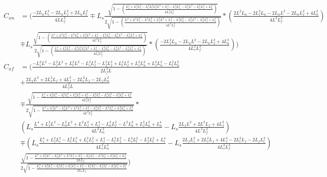 \documentclass[11pt, landscape]{article}
\begin{document}
\begin{align}
  C_{xn} &= \Bigg(\frac{-2L_nL_s^2 - 2L_nL_f^2 + 2L_nL_t^2}{4LL_f^2}
  \mp L_s\frac{\sqrt{1-\left(\frac{L_s^4 + L_s^2L_f^2 - L_s^2L_t^2 L_f^2L^2 + L_f^4 - L_f^2L_n^2 - L_n^2L^2 - L_n^2L_f^2 + L_n^4}{4L_{s}^2L_f^2}\right)}}{2\sqrt{1 - \left(\frac{L^4 + L^2L_f^2 - L^2L_n^2 + L_f^2L^2 + L_f^4 - L_f^2L_n^2 - L_n^2L^2 - L_n^2L_f^2 + L_n^4}{4L^2L_f^2}\right)}}
  *\left(\frac{2L^2L_n - 2L_f^2L_n - 2L_nL^2 - 2L_nL_f^2 + 4L_n^3}{4L^2L_f^2}\right)\\
  &\mp L_s\frac{\sqrt{1 - \left(\frac{L^4 + L^2L_f^2 - L^2L_n^2 + L_f^2L^2 + L_f^4 - L_f^2L_n^2 - L_n^2L^2 - L_n^2L_f^2 + L_n^4}{4L^2L_f^2}\right)}}{2\sqrt{1-\left(\frac{L_s^4 + L_s^2L_f^2 - L_s^2L_t^2 L_f^2L^2 + L_f^4 - L_f^2L_n^2 - L_n^2L^2 - L_n^2L_f^2 + L_n^4}{4L_{s}^2L_f^2}\right)}}
  *\left(\frac{-2L_f^2L_n - 2L_nL^2 - 2L_nL_f^2 + 4L_n^3}{4L_{s}^2L_f^2}\right)\Bigg)\\
  C_{xf} &= \Bigg(\frac{-L_s^2L^2 - L_f^2L^2 + L_t^2L^2 - L_s^2L_f^2 - L_f^2L_f^2 + L_t^2L_f^2 + L_s^2L_n^2 + L_f^2L_n^2 - L_t^2L_n^2}{{2L_f^{3}L}}\\
  &+ \frac{2L_fL^2 + 2L_s^2L_f + 4L_f^3 - 2L_t^2L_f - 2L_fL_n^2}{4L_f^2L}\\
  &\mp \frac{\sqrt{1-\frac{L_{s}^4 + L_f^2L_{s}^2 - L_t^2L_{s}^2 + L_s^2L_f^2 + L_f^4 - L_t^2L_f^2 - L_s^2L_{t}^2 - L_f^2L_{t}^2 + L_{t}^4}{4L_{s}^2L_f^2}}}{2\sqrt{1-\frac{L^4 + L_f^2L^2 - L_n^2L^2 + L^2L_f^2 + L_f^4 - L_n^2L_f^2 - L^2L_n^2 + L_f^2L_n^2 + L_n^4}{4L^2L_f^2}}}*\\
  &\left(L_s\frac{L^4 + L_f^2L^2 - L_n^2L^2 + L^2L_f^2 + L_f^4 - L_n^2L_f^2 - L^2L_n^2 + L_f^2L_n^2 + L_n^4}{4L^2L^3_{n}} - L_s\frac{2L_fL^2 + 2L^2L_f + 4L_f^3}{4L^2L_f^2}\right)\\
  &\mp \left(L_s\frac{L_{s}^4 + L_f^2L_{s}^2 - L_t^2L_{s}^2 + L_s^2L_f^2 + L_f^4 - L_t^2L_f^2 - L_s^2L_{t}^2 - L_f^2L_{t}^2 + L_{t}^4}{4L_{s}^2L^3_{n}}
    - L_s\frac{2L_fL_{s}^2 + 2L_s^2L_f + 4L_f^3 - 2L_t^2L_f - 2L_fL_{t}^2}{4L_{s}^2L_f^2}\right)\\
    &\frac{\sqrt{1-\frac{L^4 + L_f^2L^2 - L_n^2L^2 + L^2L_f^2 + L_f^4 - L_n^2L_f^2 - L^2L_n^2 + L_f^2L_n^2 + L_n^4}{2LL_f}}}{2\sqrt{1-\frac{L_{s}^4 + L_f^2L_{s}^2 - L_t^2L_{s}^2 + L_s^2L_f^2 + L_f^4 - L_t^2L_f^2 - L_s^2L_{t}^2 - L_f^2L_{t}^2 + L_{t}^4}{2L_{s}L_f}}}\Bigg)\\
\end{align}
\end{document}
